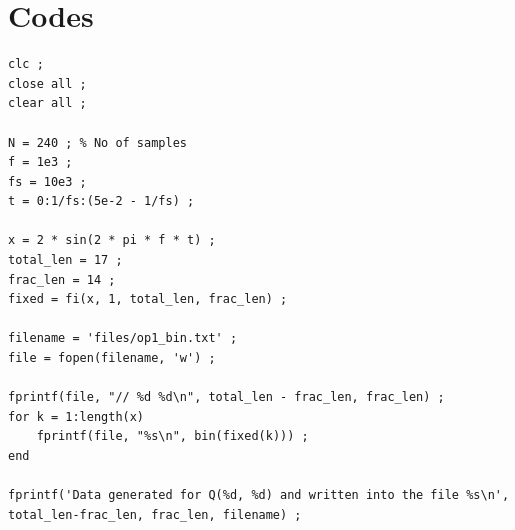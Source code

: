 \documentclass[12pt,a4paper]{article}
\begin{document}
\section{Codes}

\begin{lstlisting}[style=matlab, caption={MATLAB code for Signal Generation}]
clc ;
close all ;
clear all ;

N = 240 ; % No of samples
f = 1e3 ;
fs = 10e3 ;
t = 0:1/fs:(5e-2 - 1/fs) ;

x = 2 * sin(2 * pi * f * t) ;
total_len = 17 ;
frac_len = 14 ;
fixed = fi(x, 1, total_len, frac_len) ;

filename = 'files/op1_bin.txt' ;
file = fopen(filename, 'w') ;

fprintf(file, "// %d %d\n", total_len - frac_len, frac_len) ;
for k = 1:length(x)
    fprintf(file, "%s\n", bin(fixed(k))) ;
end

fprintf('Data generated for Q(%d, %d) and written into the file %s\n', total_len-frac_len, frac_len, filename) ;
\end{lstlisting}
\end{document}
